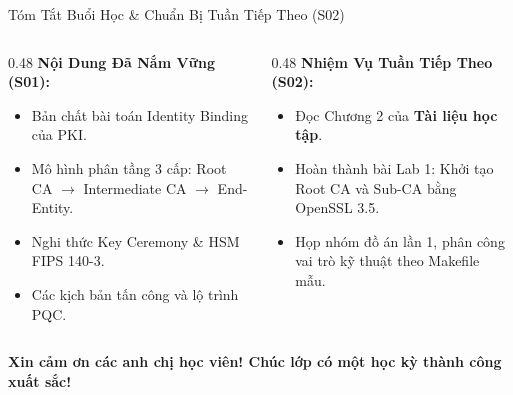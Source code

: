 \begin{frame}{Tóm Tắt Buổi Học \& Chuẩn Bị Tuần Tiếp Theo (S02)}
  \begin{columns}[T]
    \begin{column}{0.48\textwidth}
      \textbf{Nội Dung Đã Nắm Vững (S01):}
      \begin{itemize}\small
        \item Bản chất bài toán Identity Binding của PKI.
        \item Mô hình phân tầng 3 cấp: Root CA $\to$ Intermediate CA $\to$ End-Entity.
        \item Nghi thức Key Ceremony \& HSM FIPS 140-3.
        \item Các kịch bản tấn công và lộ trình PQC.
      \end{itemize}
    \end{column}
    \begin{column}{0.48\textwidth}
      \textbf{Nhiệm Vụ Tuần Tiếp Theo (S02):}
      \begin{itemize}\small
        \item Đọc Chương 2 của \textbf{Tài liệu học tập}.
        \item Hoàn thành bài Lab 1: Khởi tạo Root CA và Sub-CA bằng OpenSSL 3.5.
        \item Họp nhóm đồ án lần 1, phân công vai trò kỹ thuật theo Makefile mẫu.
      \end{itemize}
    \end{column}
  \end{columns}

  \vspace{0.6em}
  \centering\large\sffamily\bfseries\color{hcmutblue}
  Xin cảm ơn các anh chị học viên! Chúc lớp có một học kỳ thành công xuất sắc!
\end{frame}


